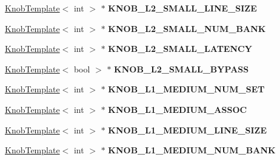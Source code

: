 \begin{DoxyCompactItemize}
\item 
\hypertarget{classall__knobs__c_abeb1d1fb58a91363427538e26fd69b63}{
\hyperlink{classKnobTemplate}{KnobTemplate}$<$ int $>$ $\ast$ {\bfseries KNOB\_\-L2\_\-SMALL\_\-LINE\_\-SIZE}}
\label{classall__knobs__c_abeb1d1fb58a91363427538e26fd69b63}

\item 
\hypertarget{classall__knobs__c_a9b4b2320f678fba66b1b8e38e8202ad4}{
\hyperlink{classKnobTemplate}{KnobTemplate}$<$ int $>$ $\ast$ {\bfseries KNOB\_\-L2\_\-SMALL\_\-NUM\_\-BANK}}
\label{classall__knobs__c_a9b4b2320f678fba66b1b8e38e8202ad4}

\item 
\hypertarget{classall__knobs__c_abb70953b2f7551fade0ff381fd3be359}{
\hyperlink{classKnobTemplate}{KnobTemplate}$<$ int $>$ $\ast$ {\bfseries KNOB\_\-L2\_\-SMALL\_\-LATENCY}}
\label{classall__knobs__c_abb70953b2f7551fade0ff381fd3be359}

\item 
\hypertarget{classall__knobs__c_acfa6b848df254858db20de66c0e3dbae}{
\hyperlink{classKnobTemplate}{KnobTemplate}$<$ bool $>$ $\ast$ {\bfseries KNOB\_\-L2\_\-SMALL\_\-BYPASS}}
\label{classall__knobs__c_acfa6b848df254858db20de66c0e3dbae}

\item 
\hypertarget{classall__knobs__c_a068711b68f3eb8a94b242feec3692b8f}{
\hyperlink{classKnobTemplate}{KnobTemplate}$<$ int $>$ $\ast$ {\bfseries KNOB\_\-L1\_\-MEDIUM\_\-NUM\_\-SET}}
\label{classall__knobs__c_a068711b68f3eb8a94b242feec3692b8f}

\item 
\hypertarget{classall__knobs__c_a4f145d4faebb6a0dc46b3b40128f7ff0}{
\hyperlink{classKnobTemplate}{KnobTemplate}$<$ int $>$ $\ast$ {\bfseries KNOB\_\-L1\_\-MEDIUM\_\-ASSOC}}
\label{classall__knobs__c_a4f145d4faebb6a0dc46b3b40128f7ff0}

\item 
\hypertarget{classall__knobs__c_a2fffa2c9d1205ed611e1e60e3b4cfaf2}{
\hyperlink{classKnobTemplate}{KnobTemplate}$<$ int $>$ $\ast$ {\bfseries KNOB\_\-L1\_\-MEDIUM\_\-LINE\_\-SIZE}}
\label{classall__knobs__c_a2fffa2c9d1205ed611e1e60e3b4cfaf2}

\item 
\hypertarget{classall__knobs__c_a62775dfd9f978a094354d7ddd9118e3f}{
\hyperlink{classKnobTemplate}{KnobTemplate}$<$ int $>$ $\ast$ {\bfseries KNOB\_\-L1\_\-MEDIUM\_\-NUM\_\-BANK}}
\label{classall__knobs__c_a62775dfd9f978a094354d7ddd9118e3f}


\end{DoxyCompactItemize}
